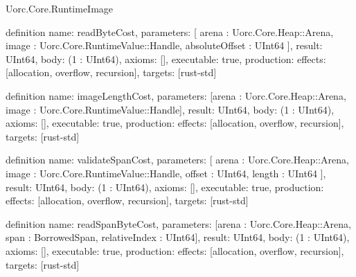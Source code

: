 \begin{lexlean}{Uorc.Core.RuntimeImage}
\begin{semanticmodule}
definition{
  name: readByteCost,
  parameters: [
    arena : Uorc.Core.Heap::Arena,
    image : Uorc.Core.RuntimeValue::Handle,
    absoluteOffset : UInt64
  ],
  result: UInt64,
  body: (1 : UInt64),
  axioms: [],
  executable: true,
  production: {effects: [allocation, overflow, recursion], targets: [rust-std]}
}

definition{
  name: imageLengthCost,
  parameters: [arena : Uorc.Core.Heap::Arena, image : Uorc.Core.RuntimeValue::Handle],
  result: UInt64,
  body: (1 : UInt64),
  axioms: [],
  executable: true,
  production: {effects: [allocation, overflow, recursion], targets: [rust-std]}
}

definition{
  name: validateSpanCost,
  parameters: [
    arena : Uorc.Core.Heap::Arena,
    image : Uorc.Core.RuntimeValue::Handle,
    offset : UInt64,
    length : UInt64
  ],
  result: UInt64,
  body: (1 : UInt64),
  axioms: [],
  executable: true,
  production: {effects: [allocation, overflow, recursion], targets: [rust-std]}
}

definition{
  name: readSpanByteCost,
  parameters: [arena : Uorc.Core.Heap::Arena, span : BorrowedSpan, relativeIndex : UInt64],
  result: UInt64,
  body: (1 : UInt64),
  axioms: [],
  executable: true,
  production: {effects: [allocation, overflow, recursion], targets: [rust-std]}
}
\end{semanticmodule}

\end{lexlean}
